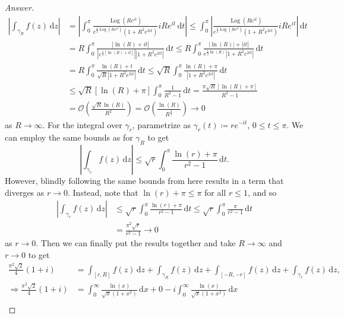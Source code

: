 \documentclass[12pt]{article}
\newcommand\paren[1]{\left( #1 \right)}
\newcommand{\sqbrack}[1]{\left [ #1 \right ]}
\newcommand{\abs}[1]{\left| #1 \right|}
\renewcommand{\i}[4]{\int_{#1}^{#2} {#3} \, \mathrm{d} {#4} }
\theoremstyle{definition}
\DeclareMathOperator\Log{Log}
\begin{document}
\begin{proof}[Answer]
\begin{align*}
        \abs{ \i{\gamma_R}{}{f(z)}{z} } & = \abs{ \i{0}{\pi}{ \frac{ \Log \paren{ Re^{it} } }{ e^{ \frac{1}{2}  \Log \paren{ Re^{it} } } \paren{ 1 + R^2 e^{2it} } } iR e^{it} }{t} } \leq \i{0}{\pi}{ \abs{ \frac{ \Log \paren{ Re^{it} } }{ e^{ \frac{1}{2}  \Log \paren{ Re^{it} } } \paren{ 1 + R^2 e^{2it} } } iR e^{it} } }{t} \\ 
        & = R \i{0}{\pi}{ \frac{ \abs{ \ln(R) + it } }{ \abs{ e^{ \frac{1}{2} \sqbrack{ \ln(R) + it } } } \abs{ 1 + R^2 e^{2it} } } }{t} \leq R \i{0}{\pi}{ \frac{ \abs{ \ln(R) } + \abs{ it } }{ e^{ \frac{1}{2} \ln(R) } \abs{ 1 + R^2 e^{2it} } } }{t} \\ 
        & = R \i{0}{\pi}{ \frac{\ln(R) + t}{\sqrt{R} \abs{ 1 + R^2 e^{2it} }} }{t} \leq \sqrt{R} \i{0}{\pi}{ \frac{\ln(R) + \pi}{ \abs{ 1 + R^2 e^{2it} } } }{t} \\ 
        & \leq \sqrt{R} \sqbrack{ \ln(R) + \pi } \i{0}{\pi}{ \frac{1}{R^2 - 1} }{t} = \frac{\pi \sqrt{R} \sqbrack{ \ln(R) + \pi } }{R^2 -1} \\
        & = \mathcal{O} \paren{ \frac{\sqrt{R} \ln(R)}{R^2} } = \mathcal{O} \paren{ \frac{\ln(R)}{R^{\frac{3}{2}}} } \to 0
    \end{align*}
    as $R \to \infty$. For the integral over $\gamma_r$, parametrize as $\gamma_r(t) \coloneqq re^{-it}$, $0 \leq t \leq \pi$. We can employ the same bounds as for $\gamma_R$ to get 
    \[
        \abs{ \i{\gamma_r}{}{f(z)}{z} } \leq \sqrt{r} \i{0}{\pi}{ \frac{ \ln(r) + \pi }{ r^2 - 1 } }{t} . 
    \]
    However, blindly following the same bounds from here results in a term that diverges as $r \to 0$. Instead, note that $\ln(r) + \pi \leq \pi$ for all $r \leq 1$, and so 
    \begin{align*}
        \abs{ \i{\gamma_r}{}{f(z)}{z} } & \leq \sqrt{r} \i{0}{\pi}{ \frac{ \ln(r) + \pi }{ r^2 - 1 } }{t} \leq \sqrt{r} \i{0}{\pi}{ \frac{ \pi }{ r^2 - 1 } }{t} \\ 
        & = \frac{\pi^2 \sqrt{r}}{r^2 - 1} \to 0 
    \end{align*}
    as $r \to 0$. Then we can finally put the results together and take $R \to \infty$ and $r \to 0$ to get 
    \begin{align*}
        \frac{\pi^2 \sqrt{2}}{4} (1 + i) & = \i{[r,R]}{}{f(z)}{z} + \i{\gamma_R}{}{f(z)}{z} + \i{[-R,-r]}{}{f(z)}{z} + \i{\gamma_r}{}{f(z)}{z} , \\ 
        \Rightarrow \frac{\pi^2 \sqrt{2}}{4} (1 + i) & = \i{0}{\infty}{ \frac{\ln(x)}{\sqrt{x} \paren{1 + x^2} } }{x} + 0 - i \i{0}{\infty}{ \frac{\ln(x)}{\sqrt{x} \paren{1 + x^2} } }{x} \\ 

\end{align*}
\end{proof}
\end{document}
